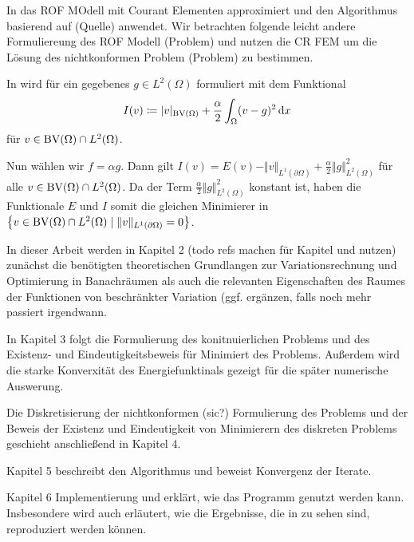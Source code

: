 In \cite{Bar15}  das ROF MOdell mit Courant Elementen 
approximiert und den Algorithmus basierend auf (Quelle) anwendet.
Wir betrachten folgende leicht andere Formuliereung des ROF Modell 
(Problem)
und nutzen die CR FEM um die Lösung des nichtkonformen Problem
(Problem) zu bestimmen.

\begin{remark}
  In \cite[Kapitel~10.1.3]{Bar15} wird  für ein
  gegebenes $g\in L^2(\Omega)$ formuliert
  mit dem Funktional 
  \begin{align*}
    I(v)\coloneqq |v|_{\textup{BV}(\Omega)} + \frac{\alpha}{2}\int_\Omega (v-g)^2\,\mathrm{d}x
  \end{align*}
  für $v\in \textup{BV}(\Omega)\cap L^2(\Omega)$.

  Nun wählen wir $f = \alpha g$. Dann gilt
  $I(v) = E(v) - \Vert v\Vert_{L^1(\partial \Omega)}+ 
  \frac{\alpha}{2}\Vert g\Vert_{L^2(\Omega)}^2$ für alle 
  $v\in \textup{BV}(\Omega)\cap L^2(\Omega)$. Da der Term $\frac{\alpha}{2}\Vert
  g\Vert_{L^2(\Omega)}^2$ konstant ist, haben die Funktionale $E$ und $I$ somit
  die gleichen Minimierer in $\left\{v\in\textup{BV}(\Omega)\cap L^2(\Omega)\mid 
  \Vert v\Vert_{L^1(\partial\Omega)}=0\right\}$.
\end{remark}

In dieser Arbeit werden in Kapitel 2 (todo refs machen für Kapitel und nutzen)
zunächst die benötigten theoretischen Grundlangen zur Variationsrechnung und
Optimierung in Banachräumen als auch die relevanten Eigenschaften des
Raumes der Funktionen von beschränkter Variation (ggf. ergänzen, falls noch
mehr passiert irgendwann.

In Kapitel 3 folgt die Formulierung des konitnuierlichen Problems und des
Existenz- und Eindeutigkeitsbeweis für Minimiert des Problems. Außerdem 
wird die starke Konverxität des Energiefunktinals gezeigt für die später
numerische Auswerung.

Die Diskretisierung der nichtkonformen (sic?) Formulierung  des Problems 
und der Beweis der Existenz und Eindeutigkeit von Minimierern des 
diskreten Problems geschieht anschließend in Kapitel 4.

Kapitel 5 beschreibt den Algorithmus und beweist Konvergenz der 
Iterate. 

Kapitel 6 Implementierung und erklärt, wie das Programm genutzt werden kann.
Insbesondere wird auch erläutert, wie die Ergebnisse, die in 
 zu sehen sind, reproduziert werden können.


